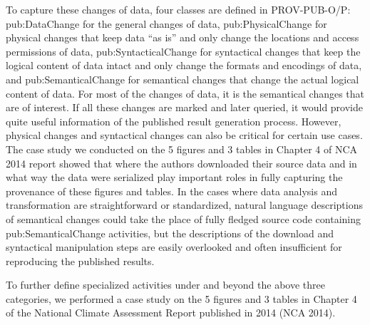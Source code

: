 To capture these changes of data, four classes are defined in PROV-PUB-O/P: pub:DataChange for the general changes of data, pub:PhysicalChange for physical changes that keep data ``as is'' and only change the locations and access permissions of data, pub:SyntacticalChange for syntactical changes that keep the logical content of data intact and only change the formats and encodings of data, and pub:SemanticalChange for semantical changes that change the actual logical content of data. For most of the changes of data, it is the semantical changes that are of interest. If all these changes are marked and later queried, it would provide quite useful information of the published result generation process. However, physical changes and syntactical changes can also be critical for certain use cases. The case study we conducted on the 5 figures and 3 tables in Chapter 4 of NCA 2014 report showed that where the authors downloaded their source data and in what way the data were serialized play important roles in fully capturing the provenance of these figures and tables. In the cases where data analysis and transformation are straightforward or standardized, natural language descriptions of semantical changes could take the place of fully fledged source code containing pub:SemanticalChange activities, but the descriptions of the download and syntactical manipulation steps are easily overlooked and often insufficient for reproducing the published results. 

To further define specialized activities under and beyond the above three categories, we performed a case study on the 5 figures and 3 tables in Chapter 4 of the National Climate Assessment Report published in 2014 (NCA 2014). 

